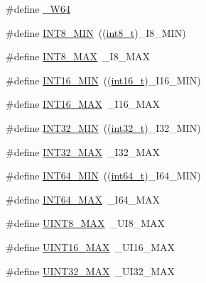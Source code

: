 \begin{DoxyCompactItemize}
\item 
\#define \hyperlink{lib-src_2lv2_2msinttypes_2stdint_8h_a3730e9bd68460c3bea497352ee69b9ae}{\+\_\+\+W64}
\item 
\#define \hyperlink{lib-src_2lv2_2msinttypes_2stdint_8h_aadcf2a81af243df333b31efa6461ab8e}{I\+N\+T8\+\_\+\+M\+IN}~((\hyperlink{lib-src_2ffmpeg_2win32_2stdint_8h_a27eddd12ef1271a2ea8629e1148e7e63}{int8\+\_\+t})\+\_\+\+I8\+\_\+\+M\+IN)
\item 
\#define \hyperlink{lib-src_2lv2_2msinttypes_2stdint_8h_aaf7f29f45f1a513b4748a4e5014ddf6a}{I\+N\+T8\+\_\+\+M\+AX}~\+\_\+\+I8\+\_\+\+M\+AX
\item 
\#define \hyperlink{lib-src_2lv2_2msinttypes_2stdint_8h_ad4e9955955b27624963643eac448118a}{I\+N\+T16\+\_\+\+M\+IN}~((\hyperlink{lib-src_2ffmpeg_2win32_2stdint_8h_a044293bfeff56852a28ed6c2cfbb2649}{int16\+\_\+t})\+\_\+\+I16\+\_\+\+M\+IN)
\item 
\#define \hyperlink{lib-src_2lv2_2msinttypes_2stdint_8h_ac58f2c111cc9989c86db2a7dc4fd84ca}{I\+N\+T16\+\_\+\+M\+AX}~\+\_\+\+I16\+\_\+\+M\+AX
\item 
\#define \hyperlink{lib-src_2lv2_2msinttypes_2stdint_8h_a688eb21a22db27c2b2bd5836943cdcbe}{I\+N\+T32\+\_\+\+M\+IN}~((\hyperlink{lib-src_2ffmpeg_2win32_2stdint_8h_a37994e3b11c72957c6f454c6ec96d43d}{int32\+\_\+t})\+\_\+\+I32\+\_\+\+M\+IN)
\item 
\#define \hyperlink{lib-src_2lv2_2msinttypes_2stdint_8h_a181807730d4a375f848ba139813ce04f}{I\+N\+T32\+\_\+\+M\+AX}~\+\_\+\+I32\+\_\+\+M\+AX
\item 
\#define \hyperlink{lib-src_2lv2_2msinttypes_2stdint_8h_ab21f12f372f67b8ff0aa3432336ede67}{I\+N\+T64\+\_\+\+M\+IN}~((\hyperlink{lib-src_2ffmpeg_2win32_2stdint_8h_a67a9885ef4908cb72ce26d75b694386c}{int64\+\_\+t})\+\_\+\+I64\+\_\+\+M\+IN)
\item 
\#define \hyperlink{lib-src_2lv2_2msinttypes_2stdint_8h_ad0d744f05898e32d01f73f8af3cd2071}{I\+N\+T64\+\_\+\+M\+AX}~\+\_\+\+I64\+\_\+\+M\+AX
\item 
\#define \hyperlink{lib-src_2lv2_2msinttypes_2stdint_8h_aeb4e270a084ee26fe73e799861bd0252}{U\+I\+N\+T8\+\_\+\+M\+AX}~\+\_\+\+U\+I8\+\_\+\+M\+AX
\item 
\#define \hyperlink{lib-src_2lv2_2msinttypes_2stdint_8h_a3ea490c9b3617d4479bd80ef93cd5602}{U\+I\+N\+T16\+\_\+\+M\+AX}~\+\_\+\+U\+I16\+\_\+\+M\+AX
\item 
\#define \hyperlink{lib-src_2lv2_2msinttypes_2stdint_8h_ab5eb23180f7cc12b7d6c04a8ec067fdd}{U\+I\+N\+T32\+\_\+\+M\+AX}~\+\_\+\+U\+I32\+\_\+\+M\+AX

\end{DoxyCompactItemize}
